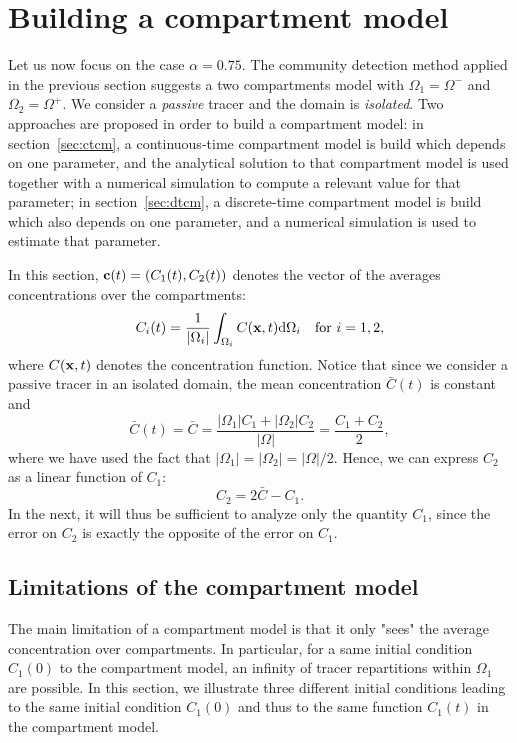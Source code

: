 \section{Building a compartment model}
Let us now focus on the case $\alpha = 0.75$. The community detection method applied in the previous section suggests a two compartments model with $\Omega_1 = \Omega^-$ and $\Omega_2 = \Omega^+$. We consider a \textit{passive} tracer and the domain is \textit{isolated}. Two approaches are proposed in order to build a compartment model: in section~\ref{sec:ctcm}, a continuous-time compartment model is build which depends on one parameter, and the analytical solution to that compartment model is used together with a numerical simulation to compute a relevant value for that parameter; in section~\ref{sec:dtcm}, a discrete-time compartment model is build which also depends on one parameter, and a numerical simulation is used to estimate that parameter.  

In this section, $\mathbf c(t) = (C_1(t),C_2(t))$ denotes the vector of the averages concentrations over the compartments:
\begin{equation}
	C_i(t) = \frac{1}{|\Omega_i|} \int_{\Omega_i} C(\mathbf x,t) \mathrm d\Omega_i \quad \mbox{for } i = 1,2,
\end{equation}
where $C(\mathbf x,t)$ denotes the concentration function. Notice that since we consider a passive tracer in an isolated domain, the mean concentration $\bar C(t)$ is constant and
\begin{equation}
	\bar C(t) = \bar C = \frac{|\Omega_1| C_1 + |\Omega_2| C_2}{|\Omega|} = \frac{C_1 + C_2}{2},
\end{equation}
where we have used the fact that $|\Omega_1| = |\Omega_2| = |\Omega|/2$. Hence, we can express $C_2$ as a linear function of $C_1$:
\begin{equation} \label{eq:C2-C1}
	C_2 = 2\bar C - C_1.
\end{equation}
In the next, it will thus be sufficient to analyze only the quantity $C_1$, since the error on $C_2$ is exactly the opposite of the error on $C_1$.


\subsection{Limitations of the compartment model}
The main limitation of a compartment model is that it only "sees" the average concentration over compartments. In particular, for a same initial condition $C_1(0)$ to the compartment model, an infinity of tracer repartitions within $\Omega_1$ are possible. In this section, we illustrate three different initial conditions leading to the same initial condition $C_1(0)$ and thus to the same function $C_1(t)$ in the compartment model.

